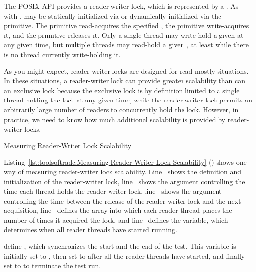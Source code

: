 The POSIX API provides a reader-writer lock, which is represented by
a .
As with ,  may be statically
initialized via  or dynamically
initialized via the  primitive.
The  primitive read-acquires the
specified , the 
primitive write-acquires it, and the 
primitive releases it.
Only a single thread may write-hold a given 
at any given time, but multiple threads may read-hold a given
, at least while there is no thread
currently write-holding it.

As you might expect, reader-writer locks are designed for read-mostly
situations.
In these situations, a reader-writer lock can provide greater scalability
than can an exclusive lock because the exclusive lock is by definition
limited to a single thread holding the lock at any given time, while
the reader-writer lock permits
an arbitrarily large number of readers to concurrently hold the lock.
However, in practice, we need to know how much additional scalability is
provided by reader-writer locks.

\begin{listing}[tbp]

\caption{Measuring Reader-Writer Lock Scalability}
\label{lst:toolsoftrade:Measuring Reader-Writer Lock Scalability}
\end{listing}

\begin{fcvref}
Listing~\ref{lst:toolsoftrade:Measuring Reader-Writer Lock Scalability}
()
shows one way of measuring reader-writer lock scalability.
Line~ shows the definition and initialization of the reader-writer
lock, line~ shows the  argument controlling the
time each thread holds the reader-writer lock,
line~ shows the  argument controlling the time between
the release of the reader-writer lock and the next acquisition,
line~ defines the  array into which each reader thread
places the number of times it acquired the lock, and
line~ defines the  variable, which
determines when all reader threads have started running.

 define ,
which synchronizes the start and the
end of the test.
This variable is initially set to , then set to
 after all the reader threads have started, and finally
set to  to terminate the test run.
\end{fcvref}

